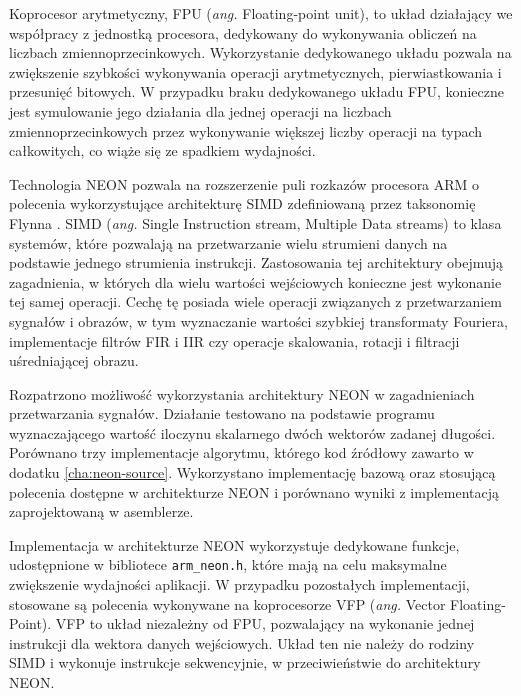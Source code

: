 Koprocesor arytmetyczny, FPU (\emph{ang.} Floating-point unit), to układ działający we współpracy z jednostką procesora, dedykowany do wykonywania obliczeń na liczbach zmiennoprzecinkowych. 
Wykorzystanie dedykowanego układu pozwala na zwiększenie szybkości wykonywania operacji arytmetycznych, pierwiastkowania i przesunięć bitowych. 
W przypadku braku dedykowanego układu FPU, konieczne jest symulowanie jego działania dla jednej operacji na liczbach zmiennoprzecinkowych przez wykonywanie większej liczby operacji na typach całkowitych, co wiąże się ze spadkiem wydajności. 

Technologia NEON pozwala na rozszerzenie puli rozkazów procesora ARM o polecenia wykorzystujące architekturę SIMD zdefiniowaną przez taksonomię Flynna \cite{Flynn1972}.
SIMD (\emph{ang.} Single Instruction stream, Multiple Data streams) to klasa systemów, które pozwalają na przetwarzanie wielu strumieni danych na podstawie jednego strumienia instrukcji. 
Zastosowania tej architektury obejmują zagadnienia, w których dla wielu wartości wejściowych konieczne jest wykonanie tej samej operacji. 
Cechę tę posiada wiele operacji związanych z przetwarzaniem sygnałów i obrazów, w tym  wyznaczanie wartości szybkiej transformaty Fouriera, implementacje filtrów FIR i IIR czy operacje skalowania, rotacji i filtracji uśredniającej obrazu.

Rozpatrzono możliwość wykorzystania architektury NEON w zagadnieniach przetwarzania sygnałów. 
Działanie testowano na podstawie programu wyznaczającego wartość iloczynu skalarnego dwóch wektorów zadanej długości. 
Porównano trzy implementacje algorytmu, którego kod źródłowy zawarto w dodatku \ref{cha:neon-source}.
Wykorzystano implementację bazową oraz stosującą polecenia dostępne w architekturze NEON i porównano wyniki z implementacją zaprojektowaną w asemblerze. 

Implementacja w architekturze NEON wykorzystuje dedykowane funkcje, udostępnione w bibliotece \texttt{arm\_neon.h}, które mają na celu maksymalne zwiększenie wydajności aplikacji. 
W przypadku pozostałych implementacji, stosowane są polecenia wykonywane na koprocesorze VFP (\emph{ang.} Vector Floating-Point). 
VFP to układ niezależny od FPU, pozwalający na wykonanie jednej instrukcji dla wektora danych wejściowych. 
Układ ten nie należy do rodziny SIMD i wykonuje instrukcje sekwencyjnie, w przeciwieństwie do architektury NEON.


